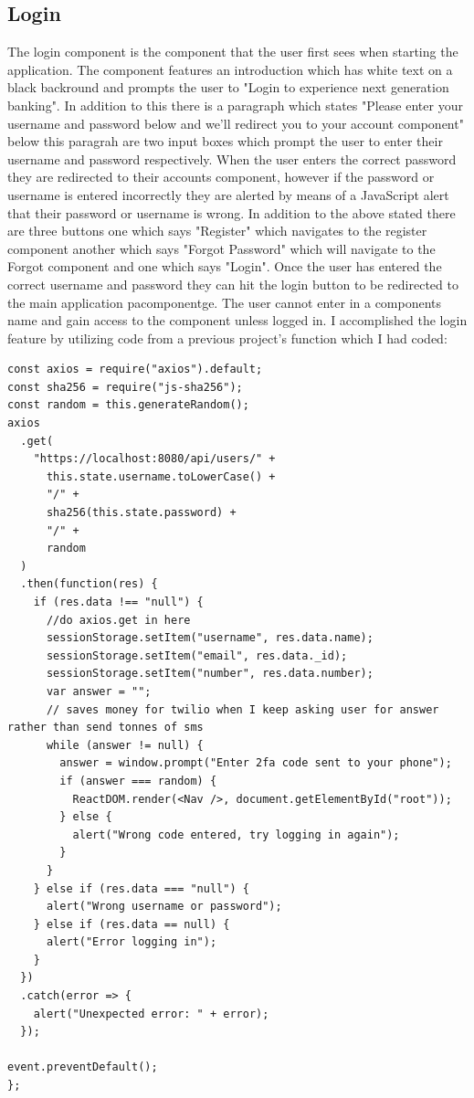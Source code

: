 \subsection{Login}
The login component is the component that the user first sees when starting the application.  The component features an introduction which has white text on a black backround and prompts the user to "Login to experience next generation banking".  In addition to this there is a paragraph which states "Please enter your username and password below and we'll redirect you to your account component"  below this paragrah are two input boxes which prompt the user to enter their username and password respectively.  When the user enters the correct password they are redirected to their accounts component, however if the password or username is entered incorrectly they are alerted by means of a JavaScript alert that their password or username is wrong.  In addition to the above stated there are three buttons one which says "Register" which navigates to the register component another which says "Forgot Password" which will navigate to the Forgot component and one which says "Login".  Once the user has entered the correct username and password they can hit the login button to be redirected to the main application pacomponentge.  The user cannot enter in a components name and gain access to the component unless logged in.  I accomplished the login feature by utilizing code from a previous project's function which I had coded:
\begin{verbatim}
const axios = require("axios").default;
const sha256 = require("js-sha256");
const random = this.generateRandom();
axios
  .get(
    "https://localhost:8080/api/users/" +
      this.state.username.toLowerCase() +
      "/" +
      sha256(this.state.password) +
      "/" +
      random
  )
  .then(function(res) {
    if (res.data !== "null") {
      //do axios.get in here
      sessionStorage.setItem("username", res.data.name);
      sessionStorage.setItem("email", res.data._id);
      sessionStorage.setItem("number", res.data.number);
      var answer = "";
      // saves money for twilio when I keep asking user for answer rather than send tonnes of sms
      while (answer != null) {
        answer = window.prompt("Enter 2fa code sent to your phone");
        if (answer === random) {
          ReactDOM.render(<Nav />, document.getElementById("root"));
        } else {
          alert("Wrong code entered, try logging in again");
        }
      }
    } else if (res.data === "null") {
      alert("Wrong username or password");
    } else if (res.data == null) {
      alert("Error logging in");
    }
  })
  .catch(error => {
    alert("Unexpected error: " + error);
  });

event.preventDefault();
};
\end{verbatim}
